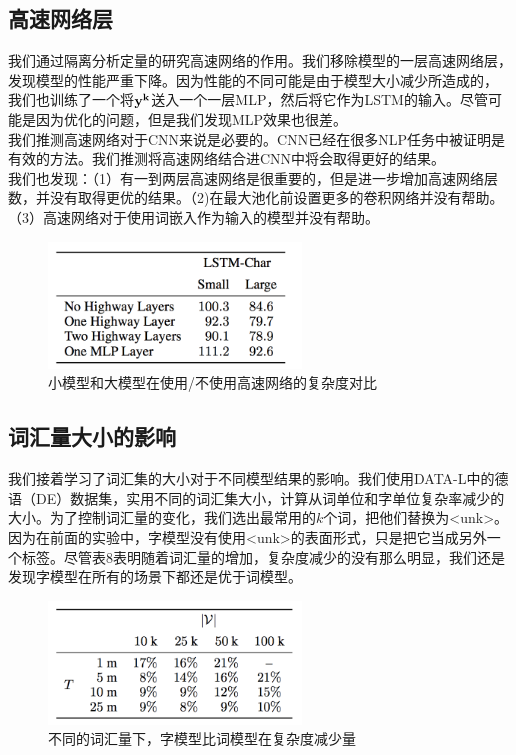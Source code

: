 \subsection{高速网络层}
我们通过隔离分析定量的研究高速网络的作用。我们移除模型的一层高速网络层，发现模型的性能严重下降。因为性能的不同可能是由于模型大小减少所造成的，
我们也训练了一个将$\bf{y}^k$送入一个一层MLP，然后将它作为LSTM的输入。尽管可能是因为优化的问题，但是我们发现MLP效果也很差。\\
我们推测高速网络对于CNN来说是必要的。CNN已经在很多NLP任务中被证明是有效的方法。我们推测将高速网络结合进CNN中将会取得更好的结果。\\
我们也发现：（1）有一到两层高速网络是很重要的，但是进一步增加高速网络层数，并没有取得更优的结果。（2)在最大池化前设置更多的卷积网络并没有帮助。（3）高速网络对于使用词嵌入作为输入的模型并没有帮助。\\
\begin{figure}[h]
  \centering
  \includegraphics[width=0.6\textwidth]{./images/table7}
  \caption{小模型和大模型在使用/不使用高速网络的复杂度对比}
\end{figure}
\subsection{词汇量大小的影响}
我们接着学习了词汇集的大小对于不同模型结果的影响。我们使用DATA-L中的德语（DE）数据集，实用不同的词汇集大小，计算从词单位和字单位复杂率减少的大小。为了控制词汇量的变化，我们选出最常用的$k$个词，把他们替换为<unk>。
因为在前面的实验中，字模型没有使用<unk>的表面形式，只是把它当成另外一个标签。尽管表8表明随着词汇量的增加，复杂度减少的没有那么明显，我们还是发现字模型在所有的场景下都还是优于词模型。\\
\begin{figure}[h]
  \centering
  \includegraphics[width=0.6\textwidth]{./images/table8}
  \caption{不同的词汇量下，字模型比词模型在复杂度减少量}
\end{figure}
